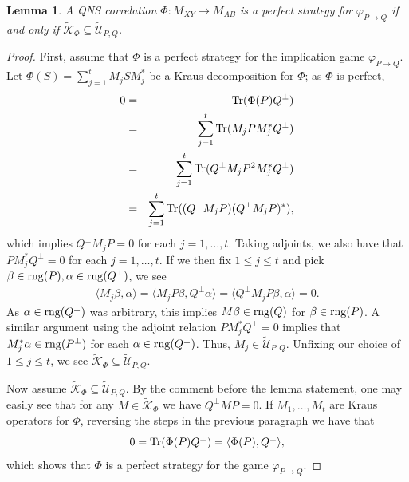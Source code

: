 \documentclass[11pt]{amsart}
\newtheorem{lemma}[theorem]{Lemma}
\newcommand{\cl}[1]{\mathcal{#1}}
\begin{document}
\begin{lemma}\label{containment_of_kraus}
A QNS correlation $\Phi: M_{XY}\rightarrow M_{AB}$ is a perfect strategy for $\varphi_{P\rightarrow Q}$ if and only if $\tilde{\cl{K}}_{\Phi} \subseteq \tilde{\cl{U}}_{P, Q}$. 
\end{lemma}
\begin{proof}
First, assume that $\Phi$ is a perfect strategy for the implication game $\varphi_{P\rightarrow Q}$. Let $\Phi(S) = \sum_{j=1}^{t}M_{j}SM_{j}^{*}$ be a Kraus decomposition for $\Phi$; as $\Phi$ is perfect, 
\begin{eqnarray*}
	0 
& = &
{\rm Tr}(\Phi(P)Q^{\perp}) \\
& = &
\sum\limits_{j=1}^{t}{\rm Tr}(M_{j}PM_{j}^{*}Q^{\perp}) \\
& = &
\sum\limits_{j=1}^{t}{\rm Tr}(Q^{\perp}M_{j}P^{2}M_{j}^{*}Q^{\perp}) \\
& = &
\sum\limits_{j=1}^{t}{\rm Tr}((Q^{\perp}M_{j}P)(Q^{\perp}M_{j}P)^{*}),
\end{eqnarray*} 
\noindent which implies $Q^{\perp}M_{j}P = 0$ for each $j = 1, \hdots, t$. Taking adjoints, we also have that $PM_{j}^{*}Q^{\perp} = 0$ for each $j = 1, \hdots, t$. If we then fix $1 \leq j \leq t$ and pick $\beta \in {\rm rng}(P), \alpha \in {\rm rng}(Q^{\perp})$, we see
\begin{gather*}
	\langle M_{j}\beta, \alpha\rangle = \langle M_{j}P\beta, Q^{\perp}\alpha\rangle = \langle Q^{\perp}M_{j}P\beta, \alpha\rangle = 0.
\end{gather*}
\noindent As $\alpha \in {\rm rng}(Q^{\perp})$ was arbitrary, this implies $M\beta \in {\rm rng}(Q)$ for $\beta \in {\rm rng}(P)$. A similar argument using the adjoint relation $PM_{j}^{*}Q^{\perp} = 0$ implies that $M_{j}^{*}\alpha \in {\rm rng}(P^{\perp})$ for each $\alpha \in {\rm rng}(Q^{\perp})$. Thus, $M_{j} \in \tilde{\cl{U}}_{P, Q}$. Unfixing our choice of $1 \leq j \leq t$, we see $\tilde{\cl{K}}_{\Phi} \subseteq \tilde{\cl{U}}_{P, Q}$.

Now assume $\tilde{\cl{K}}_{\Phi} \subseteq \tilde{\cl{U}}_{P, Q}$. By the comment before the lemma statement, one may easily see that for any $M \in \tilde{\cl{K}}_{\Phi}$ we have $Q^{\perp}MP = 0$. If $M_{1}, \hdots, M_{t}$ are Kraus operators for $\Phi$, reversing the steps in the previous paragraph we have that
\begin{gather*}
	0 = {\rm Tr}(\Phi(P)Q^{\perp}) = \langle \Phi(P), Q^{\perp}\rangle,
\end{gather*}
\noindent which shows that $\Phi$ is a perfect strategy for the game $\varphi_{P\rightarrow Q}$. 
\end{proof}
\end{document}

